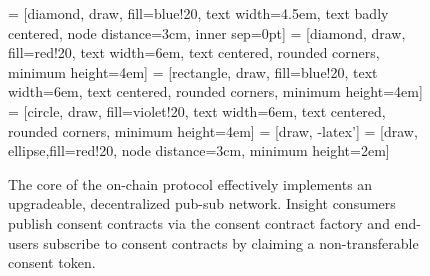 \begin{figure}[ht] 
    \centering
     = [diamond, draw, fill=blue!20, 
    text width=4.5em, text badly centered, node distance=3cm, inner sep=0pt]
     = [diamond, draw, fill=red!20, 
    text width=6em, text centered, rounded corners, minimum height=4em] 
     = [rectangle, draw, fill=blue!20, 
    text width=6em, text centered, rounded corners, minimum height=4em]
     = [circle, draw, fill=violet!20, 
        text width=6em, text centered, rounded corners, minimum height=4em]
     = [draw, -latex']
     = [draw, ellipse,fill=red!20, node distance=3cm,
        minimum height=2em]
    
    \caption{The core of the on-chain protocol effectively implements an upgradeable, decentralized pub-sub 
    network. Insight consumers publish consent contracts via the consent contract factory and end-users subscribe 
    to consent contracts by claiming a non-transferable consent token.}
    \label{fig:ConsentFactory}
  \end{figure}